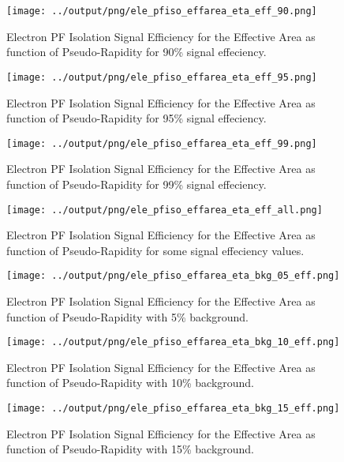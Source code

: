 \documentclass[11pt]{book}
\begin{document}
\begin{figure}[htb]
\centering
\texttt{[image: ../output/png/ele\_pfiso\_effarea\_eta\_eff\_90.png]}
\caption{Electron PF Isolation Signal Efficiency for the Effective Area as function of Pseudo-Rapidity for 90\% signal effeciency.}
\label{fig:ele_pfiso_eta_eff_effarea_eff_90}
\end{figure}

\begin{figure}[htb]
\centering
\texttt{[image: ../output/png/ele\_pfiso\_effarea\_eta\_eff\_95.png]}
\caption{Electron PF Isolation Signal Efficiency for the Effective Area as function of Pseudo-Rapidity for 95\% signal effeciency.}
\label{fig:ele_pfiso_eta_eff_effarea_eff_95}
\end{figure}

\begin{figure}[htb]
\centering
\texttt{[image: ../output/png/ele\_pfiso\_effarea\_eta\_eff\_99.png]}
\caption{Electron PF Isolation Signal Efficiency for the Effective Area as function of Pseudo-Rapidity for 99\% signal effeciency.}
\label{fig:ele_pfiso_eta_eff_effarea_eff_99}
\end{figure}

\begin{figure}[htb]
\centering
\texttt{[image: ../output/png/ele\_pfiso\_effarea\_eta\_eff\_all.png]}
\caption{Electron PF Isolation Signal Efficiency for the Effective Area as function of Pseudo-Rapidity for some signal effeciency values.}
\label{fig:ele_pfiso_eta_eff_effarea_eff_all}
\end{figure}

\begin{figure}[htb]
\centering
\texttt{[image: ../output/png/ele\_pfiso\_effarea\_eta\_bkg\_05\_eff.png]}
\caption{Electron PF Isolation Signal Efficiency for the Effective Area as function of Pseudo-Rapidity with 5\% background.}
\label{fig:ele_pfiso_eta_bkg_effarea_bkg_05_eff}
\end{figure}

\begin{figure}[htb]
\centering
\texttt{[image: ../output/png/ele\_pfiso\_effarea\_eta\_bkg\_10\_eff.png]}
\caption{Electron PF Isolation Signal Efficiency for the Effective Area as function of Pseudo-Rapidity with 10\% background.}
\label{fig:ele_pfiso_eta_bkg_effarea_bkg_10_eff}
\end{figure}

\begin{figure}[htb]
\centering
\texttt{[image: ../output/png/ele\_pfiso\_effarea\_eta\_bkg\_15\_eff.png]}
\caption{Electron PF Isolation Signal Efficiency for the Effective Area as function of Pseudo-Rapidity with 15\% background.}
\label{fig:ele_pfiso_eta_bkg_effarea_bkg_15_eff}
\end{figure}
\end{document}
